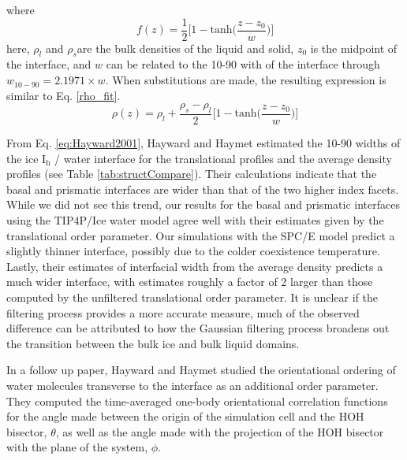 where
\begin{equation}
f(z) = \frac{1}{2}\Bigg[1-\mathrm{tanh}\Big(\frac{z-z_{0}}{w}\Big)\Bigg]
\end{equation}
here, $\rho_{l}$ and $\rho_{s}$are the bulk densities of the liquid
and solid, $z_0$ is the midpoint of the interface, and $w$ can be
related to the 10-90 with of the interface through
$w_{10-90} = 2.1971\times w$. When substitutions are made, the
resulting expression is similar to Eq. \eqref{rho_fit}.
\begin{equation}\label{eq:Hayward2001}
\rho (z) = \rho_{l} + \frac{\rho_{s} -
  \rho_{l}}{2}\Bigg[1-\mathrm{tanh}\bigg(\frac{z-z_0}{w}\bigg)\Bigg]
\end{equation}

From Eq. \eqref{eq:Hayward2001}, Hayward and Haymet estimated the
10-90 widths of the ice I$_\mathrm{h}$ / water interface for the
translational profiles and the average density profiles (see Table
\ref{tab:structCompare}). Their calculations indicate that the basal
and prismatic interfaces are wider than that of the two higher index
facets. While we did not see this trend, our results for the basal and
prismatic interfaces using the TIP4P/Ice water model agree well with
their estimates given by the translational order parameter. Our
simulations with the SPC/E model predict a slightly thinner interface,
possibly due to the colder coexistence temperature. Lastly, their
estimates of interfacial width from the average density predicts a
much wider interface, with estimates roughly a factor of 2 larger than
those computed by the unfiltered translational order parameter. It is
unclear if the filtering process provides a more accurate measure,
much of the observed difference can be attributed to how the Gaussian
filtering process broadens out the transition between the bulk ice and
bulk liquid domains.

In a follow up paper, Hayward and Haymet studied the orientational
ordering of water molecules transverse to the interface as an
additional order parameter.\cite{Hayward2002} They computed the
time-averaged one-body orientational correlation functions for the
angle made between the origin of the simulation cell and the HOH
bisector, $\theta$, as well as the angle made with the projection of
the HOH bisector with the plane of the system, $\phi$.





